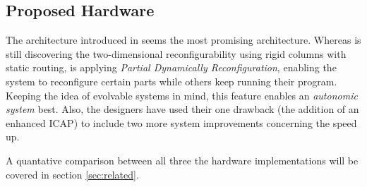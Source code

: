 
\subsection{Proposed Hardware}
\label{sec:hardware}

The architecture introduced in \cite{PDR} seems the most promising architecture. Whereas \cite{virtex4} is still discovering the two-dimensional reconfigurability using rigid columns with static routing, \cite{PDR} is applying \emph{Partial Dynamically Reconfiguration}, enabling the system to reconfigure certain parts while others keep running their program. Keeping the idea of evolvable systems in mind, this feature enables an \emph{autonomic system} best. Also, the designers have used their one drawback (the addition of an enhanced ICAP) to include two more system improvements concerning the speed up. 

A quantative comparison between all three the hardware implementations will be covered in section \ref{sec:related}.

